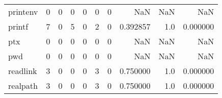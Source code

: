 \begin{tabular}{lrrrrrrrrr}
printenv  &                                       0 &                                                  0 &                                                  0 &                                                  0 &                                                  0 &                                                  0 &                                                NaN &                                    NaN &                                  NaN \\
printf    &                                       7 &                                                  0 &                                                  5 &                                                  0 &                                                  2 &                                                  0 &                                           0.392857 &                                    1.0 &                             0.000000 \\
ptx       &                                       0 &                                                  0 &                                                  0 &                                                  0 &                                                  0 &                                                  0 &                                                NaN &                                    NaN &                                  NaN \\
pwd       &                                       0 &                                                  0 &                                                  0 &                                                  0 &                                                  0 &                                                  0 &                                                NaN &                                    NaN &                                  NaN \\
readlink  &                                       3 &                                                  0 &                                                  0 &                                                  0 &                                                  3 &                                                  0 &                                           0.750000 &                                    1.0 &                             0.000000 \\
realpath  &                                       3 &                                                  0 &                                                  0 &                                                  0 &                                                  3 &                                                  0 &                                           0.750000 &                                    1.0 &                             0.000000 \\

\end{tabular}
